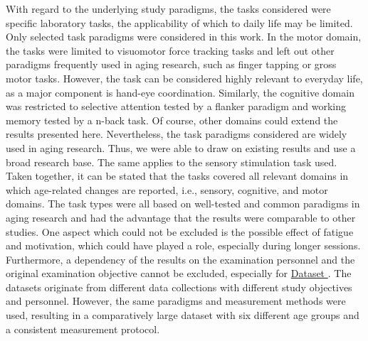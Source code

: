 With regard to the underlying study paradigms, the tasks considered were specific laboratory tasks, the applicability of which to daily life may be limited. Only selected task paradigms were considered in this work. In the motor domain, the tasks were limited to visuomotor force tracking tasks and left out other paradigms frequently used in aging research, such as finger tapping or gross motor tasks. However, the task can be considered highly relevant to everyday life, as a major component is hand-eye coordination. Similarly, the cognitive domain was restricted to selective attention tested by a flanker paradigm and working memory tested by a n-back task. Of course, other domains could extend the results presented here. Nevertheless, the task paradigms considered are widely used in aging research. Thus, we were able to draw on existing results and use a broad research base. The same applies to the sensory stimulation task used. Taken together, it can be stated that the tasks covered all relevant domains in which age-related changes are reported, i.e., sensory, cognitive, and motor domains. The task types were all based on well-tested and common paradigms in aging research and had the advantage that the results were comparable to other studies. One aspect which could not be excluded is the possible effect of fatigue and motivation, which could have played a role, especially during longer sessions. Furthermore, a dependency of the results on the examination personnel and the original examination objective cannot be excluded, especially for \hyperref[methods:datasets:II]{Dataset }. The datasets originate from different data collections with different study objectives and personnel. However, the same paradigms and measurement methods were used, resulting in a comparatively large dataset with six different age groups and a consistent measurement protocol.\\
